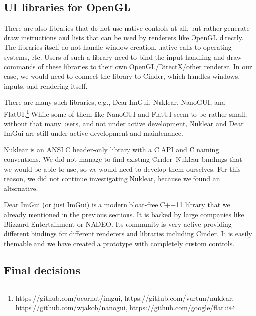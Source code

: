 \subsection{UI libraries for OpenGL}

There are also libraries that do not use native controls at all, but rather generate draw instructions and lists that can be used by renderers like OpenGL directly.
The libraries itself do not handle window creation, native calls to operating systems, etc.
Users of such a library need to bind the input handling and draw commands of these libraries to their own OpenGL/DirectX/other renderer.
In our case, we would need to connect the library to Cinder, which handles windows, inputs, and rendering itself.

There are many such libraries, e.g., Dear ImGui, Nuklear, NanoGUI, and FlatUI.\footnote{https://github.com/ocornut/imgui, https://github.com/vurtun/nuklear, https://github.com/wjakob/nanogui, https://github.com/google/flatui}
While some of them like NanoGUI and FlatUI seem to be rather small, without that many users, and not under active development, Nuklear and Dear ImGui are still under active development and maintenance.

Nuklear is an ANSI C header-only library with a C API and C naming conventions.
We did not manage to find existing Cinder--Nuklear bindings that we would be able to use, so we would need to develop them ourselves.
For this reason, we did not continue investigating Nuklear, because we found an alternative.

Dear ImGui (or just ImGui) is a modern bloat-free C++11 library that we already mentioned in the previous sections.
It is backed by large companies like Blizzard Entertainment or NADEO.
Its community is very active providing different bindings for different renderers and libraries including Cinder.
It is easily themable and we have created a prototype with completely custom controls.

\subsection{Final decisions}

